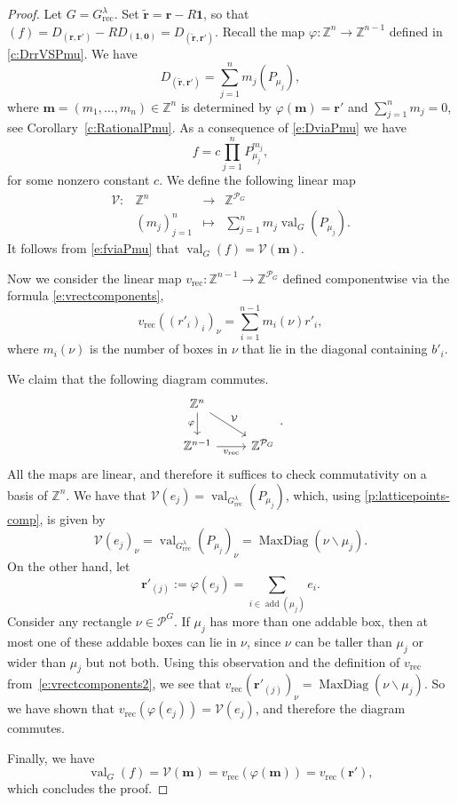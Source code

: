\documentclass{amsart}
\theoremstyle{definition}
\numberwithin{equation}{section}
\newcommand{\rect}{\mathrm{rec}}
\newcommand{\Z}{\mathbb{Z}}
\newcommand{\val}{{\operatorname{val}}}
\newcommand{\maxdiag}{{\operatorname{MaxDiag}}}
\begin{document}
\begin{proof}
Let $G=G^\lambda_{\rect}$. 
Set $\tilde {\mathbf r}=\mathbf r-R\mathbf 1$, so that
$(f)=D_{(\mathbf r,\mathbf r')}-R D_{(\mathbf 1,\mathbf 0)}=D_{(\tilde{\mathbf r},\mathbf r')}$. Recall the map $\varphi:\Z^n\to\Z^{n-1}$ defined in \cref{c:DrrVSPmu}. We have 
\begin{equation}\label{e:DviaPmu}
D_{(\tilde{\mathbf r},\mathbf r')}=\sum_{j=1}^n m_j (P_{\mu_j}),
\end{equation}
where $\mathbf m=(m_1,\dotsc, m_n)\in \Z^n$ is determined by $\varphi(\mathbf m)=\mathbf r'$ and $\sum_{j=1}^n m_j=0$, see Corollary~\ref{c:RationalPmu}. As a consequence of \eqref{e:DviaPmu} we have
\begin{equation}\label{e:fviaPmu}
f=c\prod_{j=1}^nP_{\mu_j}^{m_j},
\end{equation}
for some nonzero constant $c$. We define the following linear map
\[
\begin{array}{cccl}
\mathcal V:&\Z^n &\to & \Z^{\mathcal P_{G}}\\
&(m_j)_{j=1}^n &\mapsto & \sum_{j=1}^n m_j\val_G(P_{\mu_j}).
\end{array}
\]
It follows from \eqref{e:fviaPmu} that $\val_{G}(f)=\mathcal V(\mathbf m)$. 

Now we consider the linear map $v_{\rect}:\Z^{n-1}\to \Z^{\mathcal P_G}$ defined componentwise via the formula \eqref{e:vrectcomponents}, 
\begin{equation}\label{e:vrectcomponents2}
v_{\rect}((r'_i)_i)_\nu=\sum_{i=1}^{n-1}m_i(\nu) r'_i,
\end{equation}
where $m_i(\nu)$ is the number of boxes in $\nu$ that lie in the diagonal containing $b'_i$. 

We claim that the following diagram commutes. 
\[\begin{tikzcd}
	{\mathbb Z^n} \\
	{\mathbb Z^{n-1}} & {\mathbb Z^{\mathcal P_{G}}}
	\arrow["\varphi"', from=1-1, to=2-1]
	\arrow["{v_{\operatorname {rec}}}"', from=2-1, to=2-2]
	\arrow["{\mathcal V}", from=1-1, to=2-2]
\end{tikzcd}.\]
All the maps are linear, and therefore it suffices to check commutativity on a basis of $\Z^n$. We have that $\mathcal V(e_j)=\val_{G^\lambda_{\rect}}(P_{\mu_j})$, which, using 
	\cref{p:latticepoints-comp},
	is given by
\[
\mathcal V(e_j)_\nu=\val_{G^\lambda_{\rect}}(P_{\mu_j})_\nu=\maxdiag(\nu\backslash \mu_j).
\]
On the other hand, let 
\[
\mathbf r'_{(j)}:=
\varphi(e_j)=\sum_{i\in\operatorname{add}(\mu_j)} e_i.
\] 
Consider any rectangle $\nu\in\mathcal P^G$. If $\mu_j$ has more than one addable box, then at most one of these addable boxes can lie in $\nu$, since $\nu$ can be taller than $\mu_j$ or wider than $\mu_j$ but not both. Using this observation and the definition of $v_{\rect}$ from~\eqref{e:vrectcomponents2}, we see that $v_{\rect}(\mathbf r'_{(j)})_\nu=\maxdiag(\nu\backslash \mu_j)$. So we have shown that $v_{\rect}(\varphi(e_j))=\mathcal V(e_j)$, and therefore the diagram commutes. 

Finally, we have 
\[
\val_G(f)=\mathcal V(\mathbf m)=v_{\rect}(\varphi(\mathbf m))=v_{\rect}(\mathbf r'),
\]
which concludes the proof.
\end{proof}
\end{document}
